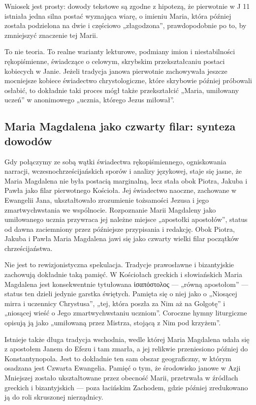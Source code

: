 Wniosek jest prosty:
dowody tekstowe są zgodne z hipotezą, że pierwotnie w J 11 istniała jedna silna postać wyznająca wiarę, o imieniu Maria, która później została podzielona na dwie i częściowo „złagodzona”, prawdopodobnie po to, by zmniejszyć znaczenie tej Marii.

To nie teoria.
To realne warianty lekturowe, podmiany imion i niestabilności rękopiśmienne, świadczące o celowym, skrybskim przekształcaniu postaci kobiecych w Janie.
Jeżeli tradycja janowa pierwotnie zachowywała jeszcze mocniejsze kobiece świadectwo chrystologiczne, które skrybowie później próbowali osłabić, to dokładnie taki proces mógł także przekształcić „Maria, umiłowany uczeń” w anonimowego „ucznia, którego Jezus miłował”.

\subsection{Maria Magdalena jako czwarty filar: synteza dowodów}\label{subsec:mary-magdalene-as-the-fourth-pillar-synthesis}

Gdy połączymy ze sobą wątki świadectwa rękopiśmiennego, ogniskowania narracji, wczesnochrześcijańskich sporów i analizy językowej, staje się jasne, że Maria Magdalena nie była postacią marginalną, lecz stała obok Piotra, Jakuba i Pawła jako filar pierwotnego Kościoła.
Jej świadectwo naoczne, zachowane w Ewangelii Jana, ukształtowało zrozumienie tożsamości Jezusa i jego zmartwychwstania we wspólnocie.
Rozpoznanie Marii Magdaleny jako umiłowanego ucznia przywraca jej należne miejsce „apostołki apostołów”, status od dawna zaciemniony przez późniejsze przypisania i redakcję.
Obok Piotra, Jakuba i Pawła Maria Magdalena jawi się jako czwarty wielki filar początków chrześcijaństwa.

Nie jest to rewizjonistyczna spekulacja.
Tradycje prawosławne i bizantyjskie zachowują dokładnie taką pamięć.
W Kościołach greckich i słowiańskich Maria Magdalena jest konsekwentnie tytułowana ἰσαπόστολος — „równą apostołom” — status ten dzieli jedynie garstka świętych.
Pamięta się o niej jako o „Niosącej mirra i uczennicy Chrystusa”, „tej, która poszła za Nim aż na Golgotę” i „niosącej wieść o Jego zmartwychwstaniu uczniom”.
Coroczne hymny liturgiczne opisują ją jako „umiłowaną przez Mistrza, stojącą z Nim pod krzyżem”.

Istnieje także długa tradycja wschodnia, wedle której Maria Magdalena udała się z apostołem Janem do Efezu i tam zmarła, a jej relikwie przeniesiono później do Konstantynopola.
Jest to dokładnie ten sam obszar geograficzny, w którym osadzana jest Czwarta Ewangelia.
Pamięć o tym, że środowisko janowe w Azji Mniejszej zostało ukształtowane przez obecność Marii, przetrwała w źródłach greckich i bizantyjskich — poza łacińskim Zachodem, gdzie później zredukowano ją do roli skruszonej nierządnicy.

